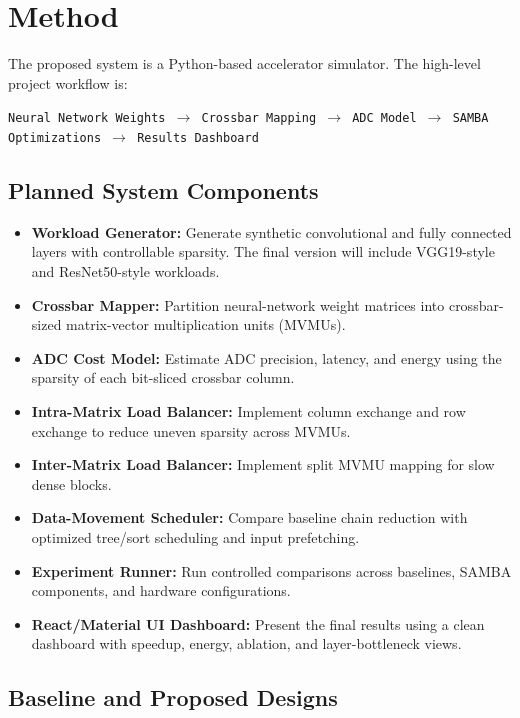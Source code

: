 \documentclass[11pt]{article}
\begin{document}
\section{Method}

The proposed system is a Python-based accelerator simulator. The high-level project workflow is:

\begin{center}
\texttt{Neural Network Weights $\rightarrow$ Crossbar Mapping $\rightarrow$ ADC Model $\rightarrow$ SAMBA Optimizations $\rightarrow$ Results Dashboard}
\end{center}

\subsection{Planned System Components}

\begin{itemize}
    \item \textbf{Workload Generator:} Generate synthetic convolutional and fully connected layers with controllable sparsity. The final version will include VGG19-style and ResNet50-style workloads.
    \item \textbf{Crossbar Mapper:} Partition neural-network weight matrices into crossbar-sized matrix-vector multiplication units (MVMUs).
    \item \textbf{ADC Cost Model:} Estimate ADC precision, latency, and energy using the sparsity of each bit-sliced crossbar column.
    \item \textbf{Intra-Matrix Load Balancer:} Implement column exchange and row exchange to reduce uneven sparsity across MVMUs.
    \item \textbf{Inter-Matrix Load Balancer:} Implement split MVMU mapping for slow dense blocks.
    \item \textbf{Data-Movement Scheduler:} Compare baseline chain reduction with optimized tree/sort scheduling and input prefetching.
    \item \textbf{Experiment Runner:} Run controlled comparisons across baselines, SAMBA components, and hardware configurations.
    \item \textbf{React/Material UI Dashboard:} Present the final results using a clean dashboard with speedup, energy, ablation, and layer-bottleneck views.
\end{itemize}

\subsection{Baseline and Proposed Designs}
\end{document}
